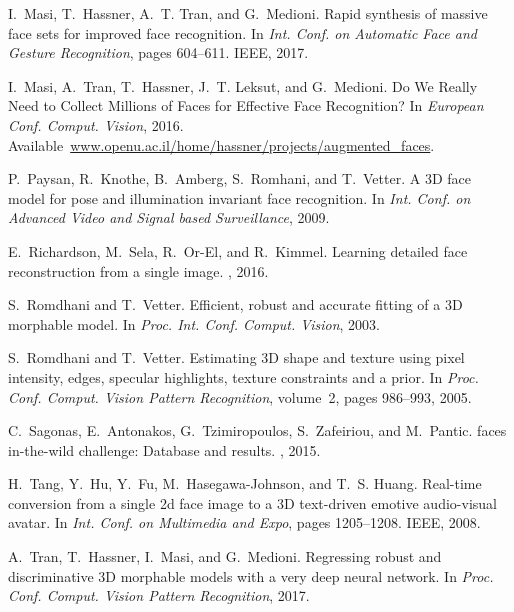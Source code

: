 \documentclass[a4paper, 10pt, conference]{ieeeconf}
\begin{document}
\begin{thebibliography}{10}
I.~Masi, T.~Hassner, A.~T. Tran, and G.~Medioni.
\newblock Rapid synthesis of massive face sets for improved face recognition.
\newblock In {\em Int. Conf. on Automatic Face and Gesture Recognition}, pages
  604--611. IEEE, 2017.

I.~Masi, A.~Tran, T.~Hassner, J.~T. Leksut, and G.~Medioni.
\newblock Do {W}e {R}eally {N}eed to {C}ollect {M}illions of {F}aces for
  {E}ffective {F}ace {R}ecognition?
\newblock In {\em European Conf. Comput. Vision}, 2016.
\newblock
  Available~\url{www.openu.ac.il/home/hassner/projects/augmented_faces}.

P.~Paysan, R.~Knothe, B.~Amberg, S.~Romhani, and T.~Vetter.
\newblock A {3D} face model for pose and illumination invariant face
  recognition.
\newblock In {\em Int. Conf. on Advanced Video and Signal based Surveillance},
  2009.

E.~Richardson, M.~Sela, R.~Or-El, and R.~Kimmel.
\newblock Learning detailed face reconstruction from a single image.
, 2016.

S.~Romdhani and T.~Vetter.
\newblock Efficient, robust and accurate fitting of a {3D} morphable model.
\newblock In {\em Proc. Int. Conf. Comput. Vision}, 2003.

S.~Romdhani and T.~Vetter.
\newblock Estimating {3D} shape and texture using pixel intensity, edges,
  specular highlights, texture constraints and a prior.
\newblock In {\em Proc. Conf. Comput. Vision Pattern Recognition}, volume~2,
  pages 986--993, 2005.

C.~Sagonas, E.~Antonakos, G.~Tzimiropoulos, S.~Zafeiriou, and M.~Pantic.
 faces in-the-wild challenge: Database and results.
, 2015.

H.~Tang, Y.~Hu, Y.~Fu, M.~Hasegawa-Johnson, and T.~S. Huang.
\newblock Real-time conversion from a single 2d face image to a {3D}
  text-driven emotive audio-visual avatar.
\newblock In {\em Int. Conf. on Multimedia and Expo}, pages 1205--1208. IEEE,
  2008.

A.~Tran, T.~Hassner, I.~Masi, and G.~Medioni.
\newblock Regressing robust and discriminative {3D} morphable models with a
  very deep neural network.
\newblock In {\em Proc. Conf. Comput. Vision Pattern Recognition}, 2017.


\end{thebibliography}
\end{document}
